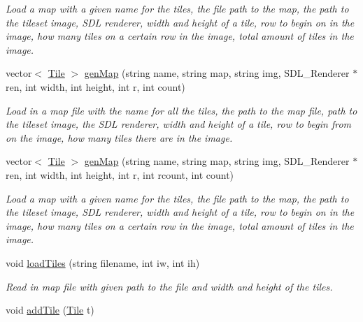 \begin{DoxyCompactItemize}
\begin{DoxyCompactList}\small\item\em Load a map with a given name for the tiles, the file path to the map, the path to the tileset image, S\+DL renderer, width and height of a tile, row to begin on in the image, how many tiles on a certain row in the image, total amount of tiles in the image. \end{DoxyCompactList}\item 
vector$<$ \hyperlink{classTile}{Tile} $>$ \hyperlink{classTileset_a6ab8298e8749b87eb7581510fb659f53}{gen\+Map} (string name, string map, string img, S\+D\+L\+\_\+\+Renderer $\ast$ren, int width, int height, int r, int count)\hypertarget{classTileset_a6ab8298e8749b87eb7581510fb659f53}{}\label{classTileset_a6ab8298e8749b87eb7581510fb659f53}

\begin{DoxyCompactList}\small\item\em Load in a map file with the name for all the tiles, the path to the map file, path to the tileset image, the S\+DL renderer, width and height of a tile, row to begin from on the image, how many tiles there are in the image. \end{DoxyCompactList}\item 
vector$<$ \hyperlink{classTile}{Tile} $>$ \hyperlink{classTileset_abafacb40bbcddc60e39f031fac531b02}{gen\+Map} (string name, string map, string img, S\+D\+L\+\_\+\+Renderer $\ast$ren, int width, int height, int r, int rcount, int count)\hypertarget{classTileset_abafacb40bbcddc60e39f031fac531b02}{}\label{classTileset_abafacb40bbcddc60e39f031fac531b02}

\begin{DoxyCompactList}\small\item\em Load a map with a given name for the tiles, the file path to the map, the path to the tileset image, S\+DL renderer, width and height of a tile, row to begin on in the image, how many tiles on a certain row in the image, total amount of tiles in the image. \end{DoxyCompactList}\item 
void \hyperlink{classTileset_a5359de30fef35821e69a2b13300e8cba}{load\+Tiles} (string filename, int iw, int ih)\hypertarget{classTileset_a5359de30fef35821e69a2b13300e8cba}{}\label{classTileset_a5359de30fef35821e69a2b13300e8cba}

\begin{DoxyCompactList}\small\item\em Read in map file with given path to the file and width and height of the tiles. \end{DoxyCompactList}\item 
void \hyperlink{classTileset_a26acaabd06601aba2e277fdd2b750fc7}{add\+Tile} (\hyperlink{classTile}{Tile} t)\hypertarget{classTileset_a26acaabd06601aba2e277fdd2b750fc7}{}\label{classTileset_a26acaabd06601aba2e277fdd2b750fc7}


\end{DoxyCompactItemize}
